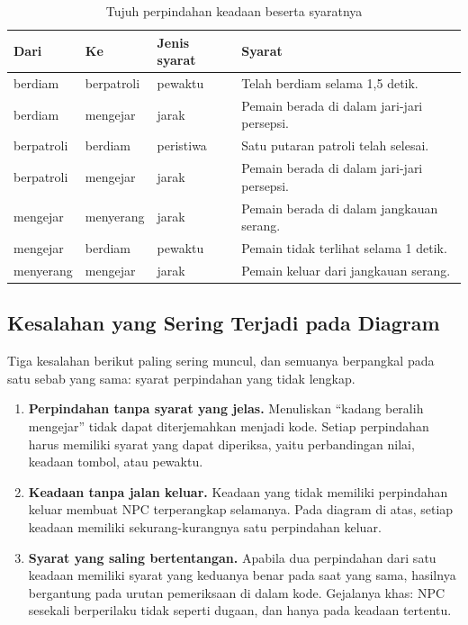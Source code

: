 \begin{table}[htbp]
\centering
\caption{Tujuh perpindahan keadaan beserta syaratnya}
\label{tab:tujuh-perpindahan}
{\setlength{\tabcolsep}{4pt}\footnotesize%
\begin{tabularx}{\textwidth}{@{}C{1.6cm} C{1.6cm} L{3.0cm} Y@{}}
\toprule
\headrow \textbf{Dari} & \textbf{Ke} & \textbf{Jenis syarat} & \textbf{Syarat} \\
\midrule
berdiam & berpatroli & pewaktu & Telah berdiam selama 1,5 detik. \\
\addlinespace
berdiam & mengejar & jarak & Pemain berada di dalam jari-jari persepsi. \\
\addlinespace
berpatroli & berdiam & peristiwa & Satu putaran patroli telah selesai. \\
\addlinespace
berpatroli & mengejar & jarak & Pemain berada di dalam jari-jari persepsi. \\
\addlinespace
mengejar & menyerang & jarak & Pemain berada di dalam jangkauan serang. \\
\addlinespace
mengejar & berdiam & pewaktu & Pemain tidak terlihat selama 1 detik. \\
\addlinespace
menyerang & mengejar & jarak & Pemain keluar dari jangkauan serang. \\
\bottomrule
\end{tabularx}}
\end{table}

\subsection{Kesalahan yang Sering Terjadi pada Diagram}

Tiga kesalahan berikut paling sering muncul, dan semuanya berpangkal pada satu
sebab yang sama: syarat perpindahan yang tidak lengkap.

\begin{enumerate}
  \item \textbf{Perpindahan tanpa syarat yang jelas.} Menuliskan ``kadang
        beralih mengejar'' tidak dapat diterjemahkan menjadi kode. Setiap
        perpindahan harus memiliki syarat yang dapat diperiksa, yaitu
        perbandingan nilai, keadaan tombol, atau pewaktu.
  \item \textbf{Keadaan tanpa jalan keluar.} Keadaan yang tidak memiliki
        perpindahan keluar membuat NPC terperangkap selamanya. Pada diagram di
        atas, setiap keadaan memiliki sekurang-kurangnya satu perpindahan
        keluar.
  \item \textbf{Syarat yang saling bertentangan.} Apabila dua perpindahan dari
        satu keadaan memiliki syarat yang keduanya benar pada saat yang sama,
        hasilnya bergantung pada urutan pemeriksaan di dalam kode. Gejalanya
        khas: NPC sesekali berperilaku tidak seperti dugaan, dan hanya pada
        keadaan tertentu.
\end{enumerate}

